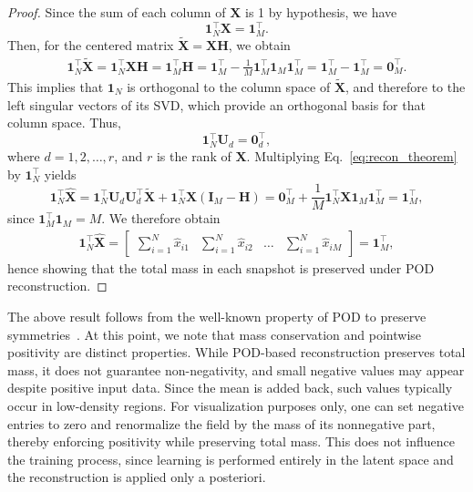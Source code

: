\documentclass{article}
\begin{document}
\begin{proof}
Since the sum of each column of $\mathbf{X}$ is 1 by hypothesis, we have
\[
\mathbf{1}_N^\top \mathbf{X} = \mathbf{1}_M^\top.
\]
Then, for the centered matrix $\tilde{\mathbf{X}} = \mathbf{X} \mathbf{H}$, we obtain
\begin{align}
\mathbf{1}_N^\top \tilde{\mathbf{X}} = \mathbf{1}_N^\top \mathbf{X} \mathbf{H} = \mathbf{1}_M^\top \mathbf{H} = \mathbf{1}_M^\top - \frac{1}{M} \mathbf{1}_M^\top \mathbf{1}_M \mathbf{1}_M^\top = \mathbf{1}_M^\top - \mathbf{1}_M^\top = \mathbf{0}_M^\top.
\end{align}
This implies that $\mathbf{1}_{N}$ is orthogonal to the column space of $\tilde{\mathbf{X}}$, and therefore to the left singular vectors of its SVD, which provide an orthogonal basis for that column space. Thus,
\begin{equation}
    \mathbf{1}_{N}^\top \mathbf{U}_d = \boldsymbol{0}^\top_d,
\end{equation}
where $d=1,2,\dots, r$, and $r$ is the rank of $\mathbf{X}$. Multiplying Eq.~\eqref{eq:recon_theorem} by $\mathbf{1}_{N}^\top$ yields
\begin{equation}
\mathbf{1}_N^\top \hat{\mathbf{X}} = \mathbf{1}_N^\top \mathbf{U}_d \mathbf{U}_d^\top \tilde{\mathbf{X}} + \mathbf{1}_N^\top \mathbf{X} (\mathbf{I}_M - \mathbf{H})  = \mathbf{0}_M^\top + \frac{1}{M} \mathbf{1}_N^\top \mathbf{X} \mathbf{1}_M \mathbf{1}_M^\top = \mathbf{1}_M^\top,
\end{equation}
since $\mathbf{1}_M^\top \mathbf{1}_M = M$. We therefore obtain
\begin{align}
    \mathbf{1}_{N}^\top \hat{\mathbf{X}} =
    \begin{bmatrix}
    \sum_{i=1}^{N} \hat{x}_{i1} &  \sum_{i=1}^{N} \hat{x}_{i2} & \dots & \sum_{i=1}^{N} \hat{x}_{iM}  
    \end{bmatrix} = \mathbf{1}^\top_{M},
\end{align}
hence showing that the total mass in each snapshot is preserved under POD reconstruction.
\end{proof}

The above result follows from the well-known property of POD to preserve symmetries~\cite{aubry1993preserving}.
At this point, we note that mass conservation and pointwise positivity are distinct properties. While POD-based reconstruction preserves total mass, it does not guarantee non-negativity, and small negative values may appear despite positive input data. Since the mean is added back, such values typically occur in low-density regions. For visualization purposes only, one can set negative entries to zero and renormalize the field by the mass of its nonnegative part, thereby enforcing positivity while preserving total mass. This does not influence the training process, since learning is performed entirely in the latent space and the reconstruction is applied only a posteriori.
\end{document}

